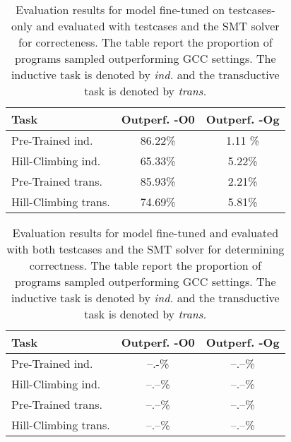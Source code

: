 \documentclass{article}
\begin{document}
\begin{table}[t]
\caption{Evaluation results for model fine-tuned on testcases-only and evaluated with testcases and the SMT solver for correcteness. The table report the proportion of programs sampled outperforming GCC settings. The inductive task is denoted by \textit{ind.} and the transductive task is denoted by \textit{trans.}}
\label{tab:z3_results}
\vskip 0.15in
\begin{center}
\begin{small}
\begin{sc}
\begin{tabular}{lcc}
\toprule
Task & Outperf. -O0 & Outperf. -Og \\
\midrule
Pre-Trained ind.    & 86.22\% & 1.11 \% \\
Hill-Climbing ind.  & 65.33\% & 5.22\% \\
Pre-Trained trans.   & 85.93\% & 2.21\% \\
Hill-Climbing trans.  & 74.69\% & 5.81\% \\
\bottomrule
\end{tabular}
\end{sc}
\end{small}
\end{center}
\vskip -0.1in
\end{table}

\begin{table}[t]
\caption{Evaluation results for model fine-tuned and evaluated with both testcases and the SMT solver for determining correctness. The table report the proportion of programs sampled outperforming GCC settings. The inductive task is denoted by \textit{ind.} and the transductive task is denoted by \textit{trans.}}
\label{tab:z3_inner_loop_results}
\vskip 0.15in
\begin{center}
\begin{small}
\begin{sc}
\begin{tabular}{lcc}
\toprule
Task & Outperf. -O0 & Outperf. -Og \\
\midrule
Pre-Trained ind.    & --.-\% & --.--\% \\
Hill-Climbing ind.  & --.--\% & --.--\% \\
Pre-Trained trans.   & --.--\% & --.--\% \\
Hill-Climbing trans.  & --.--\% & --.--\% \\
\bottomrule
\end{tabular}
\end{sc}
\end{small}
\end{center}
\vskip -0.1in
\end{table}
\end{document}

